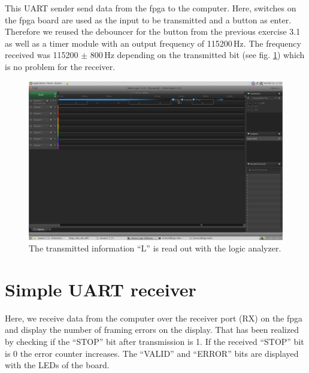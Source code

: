 This UART sender send data from the \gls{fpga} to the computer. Here, switches on the \gls{fpga} board are used as the input to be transmitted and a button as enter. Therefore we reused the debouncer for the button from the previous exercise 3.1 as well as a timer module with an output frequency of 115200\,Hz. The frequency received was 115200 $\pm$ 800\,Hz depending on the transmitted bit (see fig. \ref{fig: transmitted information e_7_2}) which is no problem for the receiver.

\begin{figure}[!htb]
	\centering
	\includegraphics[width=\linewidth]{./L7/E2/freq.png}
	\caption{The transmitted information ``L'' is read out with the logic analyzer. } 
	\label{fig: transmitted information e_7_2}
\end{figure}





\section{Simple UART receiver}

Here, we receive data from the computer over the receiver port (RX) on the \gls{fpga} and display the number of framing errors on the display. That has been realized by checking if the ``STOP'' bit after transmission is 1. If the received ``STOP'' bit is 0 the error counter increases. The ``VALID'' and ``ERROR'' bits are displayed with the LEDs of the board. 



